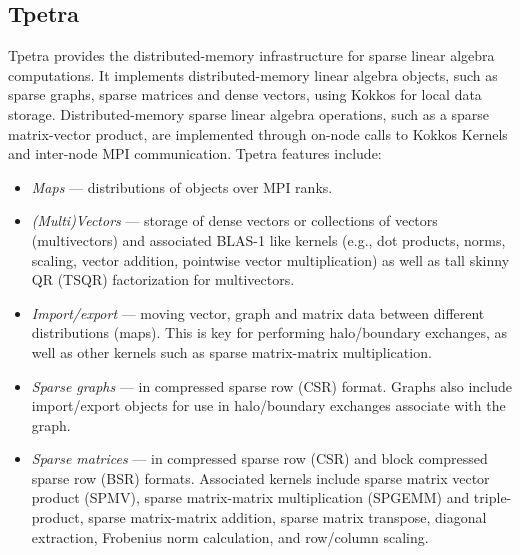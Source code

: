 \subsection{Tpetra}\label{subsec:tpetra}
Tpetra \cite{hoemmen2015tpetra} provides the distributed-memory
infrastructure for sparse linear algebra computations.  It implements
distributed-memory linear algebra objects, such as sparse graphs,
sparse matrices and dense vectors, using Kokkos for local data
storage.  Distributed-memory sparse linear algebra operations, such as
a sparse matrix-vector product, are implemented through on-node calls
to Kokkos Kernels and inter-node MPI communication.   Tpetra features
include:
\begin{itemize}
\item \textit{Maps} --- distributions of objects over MPI ranks.
\item \textit{(Multi)Vectors} --- storage of dense vectors or collections of
vectors (multivectors) and associated BLAS-1 like kernels (e.g., dot
products, norms, scaling, vector addition, pointwise vector
multiplication) as well as tall skinny QR (TSQR)  factorization for multivectors.
\item \textit{Import/export} --- moving vector, graph and matrix data
between different distributions (maps).  This is key for performing
halo/boundary exchanges, as well as other kernels such as
sparse matrix-matrix multiplication.
\item \textit{Sparse graphs} --- in compressed sparse row (CSR)
format.  Graphs also include import/export objects for use in
halo/boundary exchanges associate with the graph.
\item \textit{Sparse matrices} --- in compressed sparse row (CSR) and
block compressed sparse row (BSR) formats.  Associated kernels include
sparse matrix vector product (SPMV), sparse matrix-matrix
multiplication (SPGEMM) and triple-product, sparse matrix-matrix addition, sparse matrix transpose, diagonal extraction,
Frobenius norm calculation, and row/column scaling.
\end{itemize}


